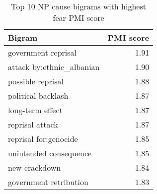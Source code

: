 \begin{table}[]
\centering
\begin{tabular}{l|r}
{\bf Bigram}               & {\bf PMI score} \\\hline
government reprisal        & 1.91            \\
attack by:ethnic\_albanian & 1.90            \\
possible reprisal          & 1.88            \\
political backlash         & 1.87            \\
long-term effect           & 1.87            \\
reprisal attack            & 1.87            \\
reprisal for:genocide      & 1.85            \\
unintended consequence     & 1.85            \\
new crackdown              & 1.84            \\
government retribution     & 1.83           
\end{tabular}
\caption{Top 10 NP cause bigrams with highest fear PMI score}
\label{tab:pmi-fear-np-cause-10}
\end{table}


%
%
%
%
%
%
%
%
